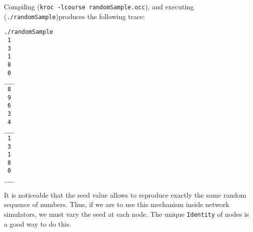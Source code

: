 Compiling ({\tt kroc -lcourse randomSample.occ}), and executing  ({\tt ./randomSample})produces the 
following trace:
\begin{lstlisting}./randomSample
 1
 3
 1
 8
 0
___
 8
 9
 6
 3
 4
___
 1
 3
 1
 8
 0
___
\end{lstlisting}

It is noticeable that the seed value allows to reproduce exactly the same random sequence of numbers.
Thus, if we are to use this mechanism inside network simulators, we must vary the seed at each node.
The unique  {\tt Identity} of nodes is a good way to do this.